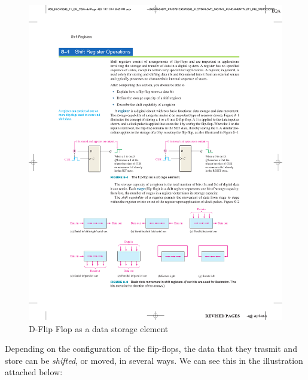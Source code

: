 \begin{figure}[H]
    \centering
    \includegraphics[scale = 1]{Graphics/VHDL/Practice 5/SHIFT_REGISTER_BASICS/D-Latch_Operation_451_2.pdf}
    \caption{D-Flip Flop as a data storage element ~\autocite{FLOYD}}
    \label{fig:D_FLIP_FLOP}
\end{figure}

\clearpage

Depending on the configuration of the flip-flops, the data that they trasmit and store can be \textit{shifted}, or moved, in several ways. We can see this in the illustration attached below:

